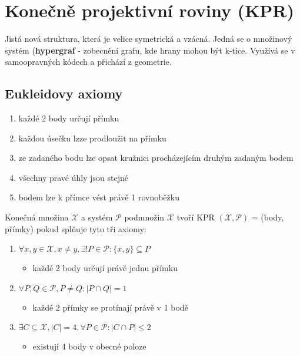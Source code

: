 \chapter{Konečně projektivní roviny (KPR)}

Jistá nová struktura, která je velice symetrická a vzácná. Jedná se o množinový systém (\textbf{hypergraf} - zobecnění grafu, kde hrany mohou být k-tice. Využívá se v samoopravných kódech a přichází z geometrie.

\section{Eukleidovy axiomy}

\begin{enumerate}
	\item každé 2 body určují přímku
	\item každou úsečku lzze prodloužit na přímku
	\item ze zadaného bodu lze opsat kružnici procházejícím druhým zadaným bodem
	\item všechny pravé úhly jsou stejné
	\item bodem lze k přímce vést právě 1 rovnoběžku
\end{enumerate}

\begin{definice}[KPR]
	Konečná množina $\mathcal{X}$ a systém $\mathcal{P}$ podmnožin $\mathcal{X}$ tvoří KPR $(\mathcal{X}, \mathcal{P})$ = (body, přímky) pokud splňuje tyto tři axiomy:
	
	\begin{enumerate}
		\item $\forall x,y \in \mathcal{X}, x \neq y, \exists !P \in \mathcal{P}: \{x,y\} \subseteq P$
		\begin{itemize}
			\item každé 2 body určují právě jednu přímku
		\end{itemize}
		\item $\forall P,Q \in \mathcal{P}, P \neq Q: |P \cap Q| = 1$
		\begin{itemize}
			\item každé 2 přímky se protínají právě v 1 bodě
		\end{itemize}
		\item $\exists C \subseteq \mathcal{X}, |C| = 4, \forall P \in \mathcal{P}: |C \cap P| \leq 2$
		\begin{itemize}
			\item existují 4 body v obecné poloze
		\end{itemize}
	\end{enumerate}
\end{definice}

